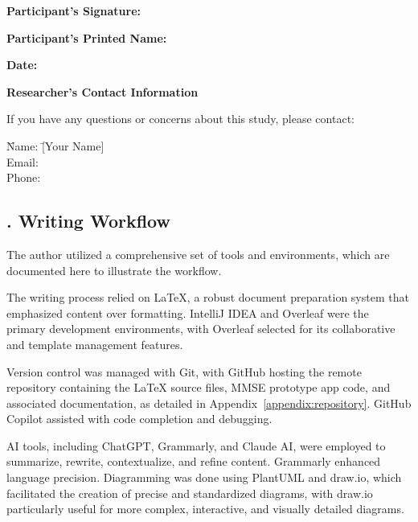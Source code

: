{\vspace{0.2cm}
\noindent
\textbf{Participant's Signature:} \underline{\hspace{8cm}}

\noindent
\textbf{Participant's Printed Name:} \underline{\hspace{8cm}}

\noindent
\textbf{Date:} \underline{\hspace{8cm}}

\vspace{0.2cm}
\noindent
\textbf{Researcher's Contact Information}

\noindent
If you have any questions or concerns about this study, please contact:

\begin{tabbing}
\hspace{2cm} \= Name: \hspace{0.5cm} \= [Your Name] \\
\> Email:  \\
\> Phone: 
\end{tabbing}
} %


\newpage
{}

\subsection*{. Writing Workflow} \label{appendix:writing-workflow}


The author utilized a comprehensive set of tools and environments, which are documented here to illustrate the workflow.

The writing process relied on \LaTeX{}, a robust document preparation system that emphasized content over formatting. IntelliJ IDEA and Overleaf were the primary development environments, with Overleaf selected for its collaborative and template management features.

Version control was managed with Git, with GitHub hosting the remote repository containing the \LaTeX{} source files, MMSE prototype app code, and associated documentation, as detailed in Appendix~\ref{appendix:repository}. GitHub Copilot assisted with code completion and debugging.

AI tools, including ChatGPT, Grammarly, and Claude AI, were employed to summarize, rewrite, contextualize, and refine content. Grammarly enhanced language precision. Diagramming was done using PlantUML and draw.io, which facilitated the creation of precise and standardized diagrams, with draw.io particularly useful for more complex, interactive, and visually detailed diagrams.
